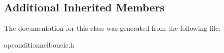 \subsection*{Additional Inherited Members}


The documentation for this class was generated from the following file\+:\begin{DoxyCompactItemize}
\item 
opconditionnelboucle.\+h\end{DoxyCompactItemize}
